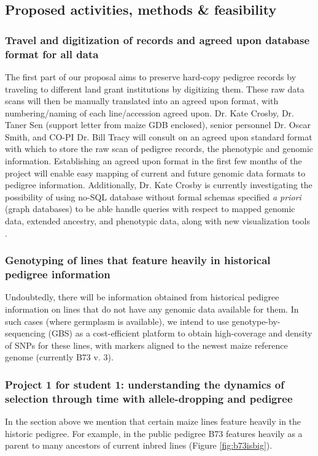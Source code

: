 \documentclass[draft,12pt]{article}
\begin{document}
\subsection*{Proposed activities, methods \& feasibility}
\subsubsection*{Travel and digitization of records and agreed upon database format for all data}
The first part of our proposal aims to preserve hard-copy pedigree records by traveling to different land grant institutions by digitizing them. 
These raw data scans will then be manually translated into an agreed upon format, with numbering/naming of each line/accession agreed upon.
Dr. Kate Crosby, Dr. Taner Sen (support letter from maize GDB enclosed), senior personnel Dr. Oscar Smith, and CO-PI Dr. Bill Tracy will consult on an agreed upon standard format with which to store the raw scan of pedigree records, the phenotypic and genomic information. 
Establishing an agreed upon format in the first few months of the project will enable easy mapping of current and future genomic data formats to pedigree information.
Additionally, Dr. Kate Crosby is currently investigating the possibility of using no-SQL database without formal schemas specified \textit{a priori} (graph databases) to be able handle queries with respect to mapped genomic data, extended ancestry, and phenotypic data, along with new visualization tools \citep{ParejaTobes:2015bf}.

\subsubsection*{Genotyping of lines that feature heavily in historical pedigree information}
Undoubtedly, there will be information obtained from historical pedigree information on lines that do not have any genomic data available for them. 
In such cases (where germplasm is available), we intend to use genotype-by-sequencing (GBS) \citep{Elshire:2011ha} as a cost-efficient platform \citep{Glaubitz:2014eu} to obtain high-coverage and density of SNPs  for these lines, with markers aligned to the newest maize reference genome (currently B73 v. 3). 

\subsubsection*{Project 1 for student 1: understanding the dynamics of selection through time with allele-dropping and pedigree}
In the section above we mention that certain maize lines feature heavily in the historic pedigree. For example, in the public pedigree B73 features heavily as a parent to many ancestors of current inbred lines (Figure \ref{fig:b73isbig}). 
\end{document}
